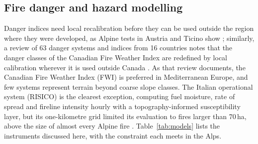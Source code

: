 \documentclass[11pt,a4paper]{article}
\begin{document}
\subsection{Fire danger and hazard modelling}

Danger indices need local recalibration before they can be used outside the region where they were developed, as Alpine tests in Austria and Ticino show \citep{arpaci_selecting_2013, de_angelis_modelling_2015}; similarly, a review of 63 danger systems and indices from 16 countries notes that the danger classes of the Canadian Fire Weather Index are redefined by local calibration wherever it is used outside Canada \citep{zacharakis_environmental_2023}. As that review documents, the Canadian Fire Weather Index (FWI) is preferred in Mediterranean Europe, and few systems represent terrain beyond coarse slope classes. The Italian operational system (RISICO) is the clearest exception, computing fuel moisture, rate of spread and fireline intensity hourly with a topography-informed susceptibility layer, but its one-kilometre grid limited its evaluation to fires larger than 70\,ha, above the size of almost every Alpine fire \citep{perello_fuelaware_2025}. Table~\ref{tab:models} lists the instruments discussed here, with the constraint each meets in the Alps.
\end{document}
